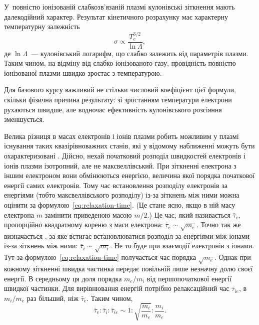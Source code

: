 У~повністю іонізованій слабкозв'язаній плазмі кулонівські зіткнення мають далекодійний характер. Результат кінетичного розрахунку має характерну температурну залежність
\begin{equation}
	\sigma\propto
	\frac{T_e^{3/2}}{\ln\Lambda},
\end{equation}
де $\ln\Lambda$~--- кулонівський логарифм, що слабко залежить від параметрів плазми. Таким чином, на відміну від слабко іонізованого газу, провідність повністю іонізованої плазми швидко зростає з температурою.

Для базового курсу важливий не стільки числовий коефіцієнт цієї формули, скільки фізична причина результату: зі зростанням температури електрони рухаються швидше, але водночас ефективність кулонівського розсіяння зменшується.

Велика різниця в масах електронів і іонів плазми робить можливим у плазмі існування таких квазірівноважних станів, які у відомому наближенні можуть бути охарактеризовані . Дійсно, нехай початковий розподіл швидкостей електронів і іонів плазми ізотропний, але не максвеллівський. При зіткненні електрона з іншим електроном вони обмінюються енергією, величина якої порядка початкової енергії самих електронів. Тому час встановлення розподілу електронів за енергіями (тобто максвеллівського розподілу) із-за зіткнень між ними можна оцінити за формулою~\eqref{eq:relaxation-time}. (Це стане ясно, якщо в ній масу електрона $m$ замінити приведеною масою $m/2$.) Це час, який називається  $\bar{\tau}_e$, пропорційно квадратному кореню з маси електрона: $\bar{\tau}_e \sim \sqrt{m_e}$. Точно так же визначається , за яке встигає встановлюватися розподіл за енергіями між іонами із-за зіткнень між ними: $\bar{\tau}_i \sim \sqrt{m_i}$. Не то буде при взаємодії електронів з іонами. Тут за формулою~\eqref{eq:relaxation-time} получається час порядка $\sqrt{m_e}$. Однак при кожному зіткненні швидка частинка передає повільній лише незначну долю своєї енергії. В середньому ця доля порядка $m_e/m_i$ від першопочаткової енергії швидкої частинки. Для вирівнювання енергій потрібно релаксаційний час $\bar{\tau}_{ie}$, в $m_i/m_e$ раз більший, ніж $\bar{\tau}_e$. Таким чином,
\begin{equation}\label{eq:relaxation-times-ratio}
	\bar{\tau}_e : \bar{\tau}_i : \bar{\tau}_{ie} \sim 1 : \sqrt{\frac{m_i}{m_e}} : \frac{m_i}{m_e}.
\end{equation}

